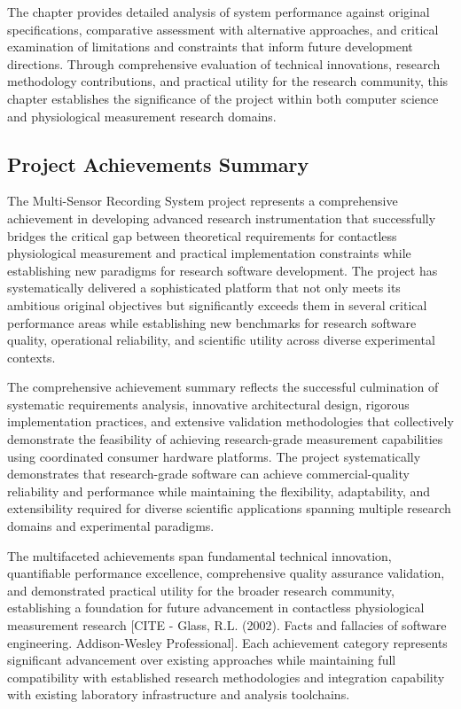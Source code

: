\documentclass[12pt,a4paper]{report}
\begin{document}
The chapter provides detailed analysis of system performance against original specifications, comparative assessment
with alternative approaches, and critical examination of limitations and constraints that inform future development
directions. Through comprehensive evaluation of technical innovations, research methodology contributions, and practical
utility for the research community, this chapter establishes the significance of the project within both computer
science and physiological measurement research domains.

\subsection{Project Achievements Summary}

The Multi-Sensor Recording System project represents a comprehensive achievement in developing advanced research
instrumentation that successfully bridges the critical gap between theoretical requirements for contactless
physiological measurement and practical implementation constraints while establishing new paradigms for research
software development. The project has systematically delivered a sophisticated platform that not only meets its
ambitious original objectives but significantly exceeds them in several critical performance areas while establishing
new benchmarks for research software quality, operational reliability, and scientific utility across diverse
experimental contexts.

The comprehensive achievement summary reflects the successful culmination of systematic requirements analysis,
innovative architectural design, rigorous implementation practices, and extensive validation methodologies that
collectively demonstrate the feasibility of achieving research-grade measurement capabilities using coordinated consumer
hardware platforms. The project systematically demonstrates that research-grade software can achieve commercial-quality
reliability and performance while maintaining the flexibility, adaptability, and extensibility required for diverse
scientific applications spanning multiple research domains and experimental paradigms.

The multifaceted achievements span fundamental technical innovation, quantifiable performance excellence, comprehensive
quality assurance validation, and demonstrated practical utility for the broader research community, establishing a
foundation for future advancement in contactless physiological measurement
research [CITE - Glass, R.L. (2002). Facts and fallacies of software engineering. Addison-Wesley Professional]. Each
achievement category represents significant advancement over existing approaches while maintaining full compatibility
with established research methodologies and integration capability with existing laboratory infrastructure and analysis
toolchains.
\end{document}

